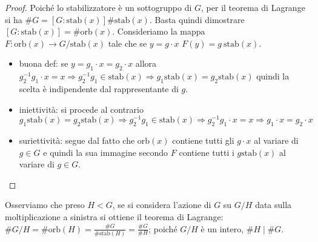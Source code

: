 \begin{proof}
    Poiché lo stabilizzatore è un sottogruppo di $G$, per il teorema di Lagrange si ha $\#G = [G : \text{stab}(x) ]\#\text{stab}(x)$. Basta quindi dimostrare $[G : \text{stab}(x) ] = \# \text{orb}(x)$. Consideriamo la mappa \\ $F : \text{orb}(x) \rightarrow G/\text{stab}(x)$ tale che se $y = g\cdot x$ $F(y) = g \ \text{stab}(x)$.
    \begin{itemize}
        \item buona def: se $y = g_1\cdot x = g_2\cdot x$ allora $g_2^{-1}g_1 \cdot x = x \Rightarrow g_2^{-1}g_1 \in \text{stab}(x) \Rightarrow g_1\text{stab}(x) = g_2\text{stab}(x)$ quindi la scelta è indipendente dal rappresentante di $g$.
        \item iniettività: si procede al contrario $g_1\text{stab}(x) = g_2\text{stab}(x) \Rightarrow g_2^{-1}g_1 \in \text{stab}(x) \Rightarrow g_2^{-1}g_1 \cdot x = x \Rightarrow g_1\cdot x = g_2\cdot x$
        \item suriettività: segue dal fatto che $\text{orb}(x)$ contiene tutti gli $g\cdot x$ al variare di $g \in G$ e quindi la sua immagine secondo $F$ contiene tutti i $g \text{stab}(x)$ al variare di $g \in G$.
    \end{itemize}
\end{proof}

Osserviamo che preso $H < G$, se si considera l'azione di $G$ su $G/H$ data sulla moltiplicazione a sinistra si ottiene il teorema di Lagrange: $\#G/H = \#\text{orb}(H) = \frac{\#G}{\#\text{stab}(H)} = \frac{\#G}{\#H}$; poiché $G/H$ è un intero, $\#H \mid \#G$.


